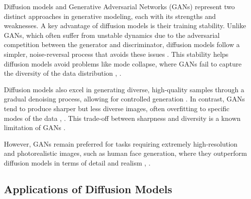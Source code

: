 Diffusion models and Generative Adversarial Networks (GANs) represent two distinct approaches in generative modeling, each with its strengths and weaknesses. A key advantage of diffusion models is their training stability. Unlike GANs, which often suffer from unstable dynamics due to the adversarial competition between the generator and discriminator, diffusion models follow a simpler, noise-reversal process that avoids these issues \citep{10.1109/access.2023.3272032}. This stability helps diffusion models avoid problems like mode collapse, where GANs fail to capture the diversity of the data distribution \citep{10.1049/ipr2.12487}, \citep{10.3390/e25121657}.

Diffusion models also excel in generating diverse, high-quality samples through a gradual denoising process, allowing for controlled generation \citep{10.1117/1.jei.32.4.043029}. In contrast, GANs tend to produce sharper but less diverse images, often overfitting to specific modes of the data \citep{10.48550/arxiv.1910.04302}, \citep{10.48550/arxiv.2207.01561}. This trade-off between sharpness and diversity is a known limitation of GANs \citep{10.1111/rssb.12476}.

However, GANs remain preferred for tasks requiring extremely high-resolution and photorealistic images, such as human face generation, where they outperform diffusion models in terms of detail and realism \citep{10.54254/2755-2721/18/20230984}, \citep{10.3390/e22091055}.
\subsection{Applications of Diffusion Models}


